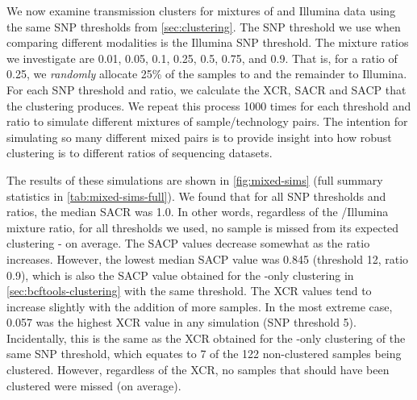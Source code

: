 \noindent
We now examine transmission clusters for mixtures of \ont{} and Illumina data using the same SNP thresholds from \autoref{sec:clustering}. The SNP threshold we use when comparing different modalities is the Illumina SNP threshold. The mixture ratios we investigate are 0.01, 0.05, 0.1, 0.25, 0.5, 0.75, and 0.9. That is, for a ratio of 0.25, we \emph{randomly} allocate 25\% of the samples to \ont{} and the remainder to Illumina. For each SNP threshold and ratio, we calculate the XCR, SACR and SACP that the clustering produces. We repeat this process 1000 times for each threshold and ratio to simulate different mixtures of sample/technology pairs. The intention for simulating so many different mixed pairs is to provide insight into how robust clustering is to different ratios of sequencing datasets.  

The results of these simulations are shown in \autoref{fig:mixed-sims} (full summary statistics in \autoref{tab:mixed-sims-full}). We found that for all SNP thresholds and ratios, the median SACR was 1.0. In other words, regardless of the \ont{}/Illumina mixture ratio, for all thresholds we used, no sample is missed from its expected clustering - on average. The SACP values decrease somewhat as the \ont{} ratio increases. However, the lowest median SACP value was 0.845 (threshold 12, ratio 0.9), which is also the SACP value obtained for the \ont{}-only clustering in \autoref{sec:bcftools-clustering} with the same threshold. The XCR values tend to increase slightly with the addition of more \ont{} samples. In the most extreme case, 0.057 was the highest XCR value in any simulation (SNP threshold 5). Incidentally, this is the same as the XCR obtained for the \ont{}-only clustering of the same SNP threshold, which equates to 7 of the 122 non-clustered samples being clustered. However, regardless of the XCR, no samples that should have been clustered were missed (on average).

